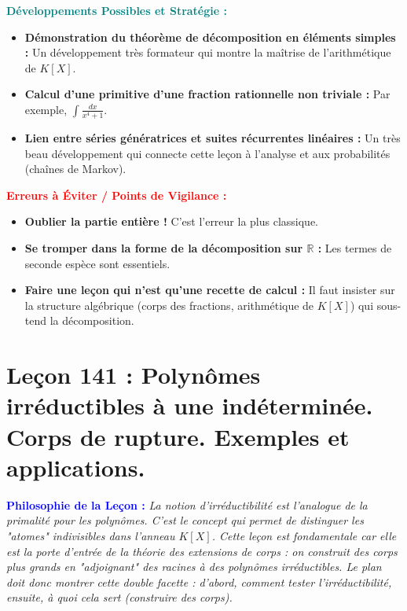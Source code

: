\documentclass[12pt, a4paper, parskip=full]{report}
\theoremstyle{agregstyle}
\newenvironment{philosophie}
  {\par\medskip\noindent\begin{oframed}\noindent\textbf{\textcolor{blue}{Philosophie de la Leçon :}}\itshape}
  {\end{oframed}\par\medskip}
\newenvironment{developpements}
  {\par\medskip\noindent\begin{oframed}\noindent\textbf{\textcolor{teal}{Développements Possibles et Stratégie :}}}
  {\end{oframed}\par\medskip}
\newenvironment{erreurs}
  {\par\medskip\noindent\begin{oframed}\noindent\textbf{\textcolor{red}{Erreurs à Éviter / Points de Vigilance :}}}
  {\end{oframed}\par\medskip}
\begin{document}
\begin{developpements}
    \begin{itemize}
        \item \textbf{Démonstration du théorème de décomposition en éléments simples :} Un développement très formateur qui montre la maîtrise de l'arithmétique de $K[X]$.
        \item \textbf{Calcul d'une primitive d'une fraction rationnelle non triviale :} Par exemple, $\int \frac{dx}{x^4+1}$.
        \item \textbf{Lien entre séries génératrices et suites récurrentes linéaires :} Un très beau développement qui connecte cette leçon à l'analyse et aux probabilités (chaînes de Markov).
    \end{itemize}
\end{developpements}

\begin{erreurs}
    \begin{itemize}
        \item \textbf{Oublier la partie entière !} C'est l'erreur la plus classique.
        \item \textbf{Se tromper dans la forme de la décomposition sur $\mathbb{R}$ :} Les termes de seconde espèce sont essentiels.
        \item \textbf{Faire une leçon qui n'est qu'une recette de calcul :} Il faut insister sur la structure algébrique (corps des fractions, arithmétique de $K[X]$) qui sous-tend la décomposition.
    \end{itemize}
\end{erreurs}
\chapter{Leçon 141 : Polynômes irréductibles à une indéterminée. Corps de rupture. Exemples et applications.}

\begin{philosophie}
    La notion d'irréductibilité est l'analogue de la primalité pour les polynômes. C'est le concept qui permet de distinguer les "atomes" indivisibles dans l'anneau $K[X]$. Cette leçon est fondamentale car elle est la porte d'entrée de la théorie des extensions de corps : on construit des corps plus grands en "adjoignant" des racines à des polynômes irréductibles. Le plan doit donc montrer cette double facette : d'abord, comment tester l'irréductibilité, ensuite, à quoi cela sert (construire des corps).
\end{philosophie}
\end{document}
